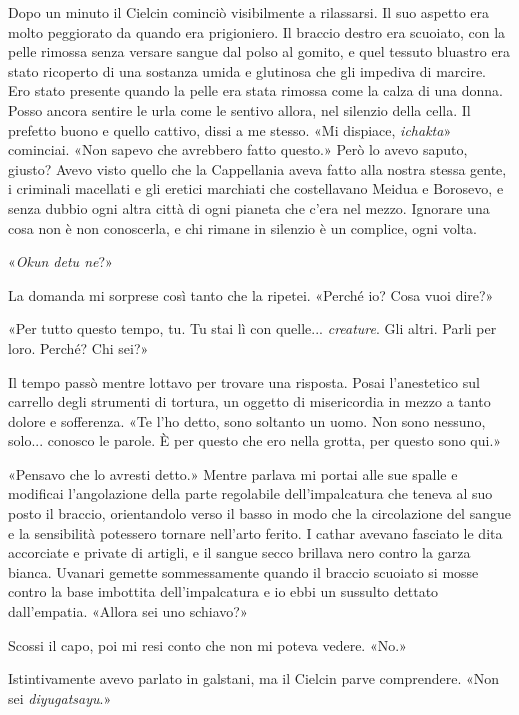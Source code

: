 Dopo un minuto il Cielcin cominciò visibilmente a rilassarsi. Il suo
aspetto era molto peggiorato da quando era prigioniero. Il braccio
destro era scuoiato, con la pelle rimossa senza versare sangue dal polso
al gomito, e quel tessuto bluastro era stato ricoperto di una sostanza
umida e glutinosa che gli impediva di marcire. Ero stato presente quando
la pelle era stata rimossa come la calza di una donna. Posso ancora
sentire le urla come le sentivo allora, nel silenzio della cella. Il
prefetto buono e quello cattivo, dissi a me stesso. «Mi dispiace,
\emph{ichakta}» cominciai. «Non sapevo che avrebbero fatto questo.» Però
lo avevo saputo, giusto? Avevo visto quello che la Cappellania aveva
fatto alla nostra stessa gente, i criminali macellati e gli eretici
marchiati che costellavano Meidua e Borosevo, e senza dubbio ogni altra
città di ogni pianeta che c'era nel mezzo. Ignorare una cosa non è non
conoscerla, e chi rimane in silenzio è un complice, ogni volta.

«\emph{Okun detu ne}?»

La domanda mi sorprese così tanto che la ripetei. «Perché io? Cosa vuoi
dire?»

«Per tutto questo tempo, tu. Tu stai lì con quelle... \emph{creature}.
Gli altri. Parli per loro. Perché? Chi sei?»

Il tempo passò mentre lottavo per trovare una risposta. Posai
l'anestetico sul carrello degli strumenti di tortura, un oggetto di
{misericordia} in mezzo a tanto dolore e sofferenza. «Te l'ho detto,
sono soltanto un uomo. Non sono nessuno, solo... conosco le parole. È
per questo che ero nella grotta, per questo sono qui.»

«Pensavo che lo avresti detto.» Mentre parlava mi portai alle sue spalle
e modificai l'angolazione della parte regolabile dell'impalcatura che
teneva al suo posto il braccio, orientandolo verso il basso in modo che
la circolazione del sangue e la sensibilità potessero tornare nell'arto
ferito. I cathar avevano fasciato le dita accorciate e private di
artigli, e il sangue secco brillava nero contro la garza bianca. Uvanari
gemette sommessamente quando il braccio scuoiato si mosse contro la base
imbottita dell'impalcatura e io ebbi un sussulto dettato dall'empatia.
«Allora sei uno schiavo?»

Scossi il capo, poi mi resi conto che non mi poteva vedere. «No.»

Istintivamente avevo parlato in galstani, ma il Cielcin parve
comprendere. «Non sei \emph{diyugatsayu}.»


